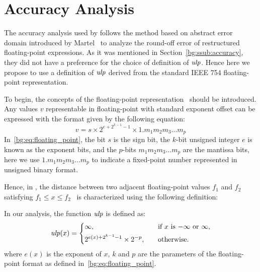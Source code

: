 \section{Accuracy Analysis}
\label{so:sec:accuracy}

The accuracy analysis used by \soap{} follows the method based on abstract
error domain introduced by Martel~\cite{martel07} to analyze the round-off
error of restructured floating-point expressions.  As it was mentioned in
Section~\ref{bg:ssub:accuracy}, they did not have a preference for the choice
of definition of $\operatorname{\mathit{ulp}}$.  Hence here we propose to use a definition of $\operatorname{\mathit{ulp}}$
derived from the standard IEEE 754 floating-point representation.

To begin, the concepts of the floating-point representation~\cite{ieee754}
should be introduced.  Any values $v$ representable in floating-point with
standard exponent offset can be expressed with the format given by the
following equation:
\begin{equation}
    v = s \times 2^{e + 2^{k - 1} - 1} \times 1.{m_1 m_2 m_3 \ldots m_p}
    \label{bg:eq:floating_point}
\end{equation}
In~\eqref{bg:eq:floating_point}, the bit $s$ is the sign bit, the $k$-bit
unsigned integer $e$ is known as the exponent bits, and the $p$-bits $m_1 m_2
m_3 \ldots m_p$ are the mantissa bits, here we use $1.{m_1 m_2 m_3 \ldots m_p}$
to indicate a fixed-point number represented in unsigned binary format.

Hence, in \soap{}, the distance between two
adjacent floating-point values $f_1$ and $f_2$ satisfying $f_1 \leq x \leq
f_2$~\cite{goldberg} is characterized using the following definition:
\begin{definition}
    In our analysis, the function $\operatorname{\mathit{ulp}}$ is defined as:
    \begin{equation}
        \operatorname{\mathit{ulp}}(x) = \left\{
            \begin{aligned}
                & \infty,  && \text{if $x$ is $-\infty$ or $\infty$}, \\
                & 2^{e(x) + 2^{k - 1} - 1} \times 2^{-p},
                \quad && \text{otherwise}.
            \end{aligned}
        \right.
    \end{equation}
    where $e(x)$ is the exponent of $x$, $k$ and $p$ are the parameters of the
    floating-point format as defined in~\eqref{bg:eq:floating_point}.
    {}\label{so:def:ulp}
\end{definition}


